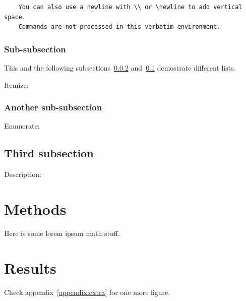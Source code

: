\documentclass[12pt, a4paper, oneside]{article}
\begin{document}
\begin{verbatim}
    You can also use a newline with \\ or \newline to add vertical space.
    Commands are not processed in this verbatim environment.
\end{verbatim}

\subsubsection{Sub-subsection}

This and the following subsections~\ref{subsubsec:another} and~\ref{subsec:third-subsection} demostrate different lists.

Itemize:
\blinditemize

\subsubsection{Another sub-subsection} \label{subsubsec:another}

Enumerate:
\blindenumerate

\subsection{Third subsection} \label{subsec:third-subsection}

Description:
\blinddescription

\clearpage


\section{Methods} \label{sec:methods}

Here is some lorem ipsum math stuff.

\blindmathpaper

\clearpage


\section{Results} \label{sec:analysis}

Check appendix~\ref{appendix:extra} for one more figure.
\end{document}
